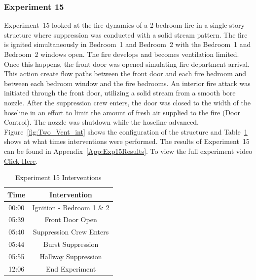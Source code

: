 \documentclass[12pt,oneside]{book}
\begin{document}
\subsubsection{Experiment 15}
Experiment~15 looked at the fire dynamics of a 2-bedroom fire in a single-story structure where suppression was conducted with a solid stream pattern. The fire is ignited simultaneously in Bedroom~1 and Bedroom~2 with the Bedroom~1 and Bedroom~2 windows open. The fire develops and becomes ventilation limited. Once this happens, the front door was opened simulating fire department arrival. This action create flow paths between the front door and each fire bedroom and between each bedroom window and the fire bedrooms. An interior fire attack was initiated through the front door, utilizing a solid stream from a smooth bore nozzle. After the suppression crew enters, the door was closed to the width of the hoseline in an effort to limit the amount of fresh air supplied to the fire (Door Control). The nozzle was shutdown while the hoseline advanced. Figure~\ref{fig:Two_Vent_int} shows the configuration of the structure and Table~\ref{Table:Exp15Interventions} shows at what times interventions were performed. The results of Experiment~15 can be found in Appendix~\ref{App:Exp15Results}. To view the full experiment video \href{https://player.vimeo.com/video/170499619?autoplay=1}{Click Here}.

\begin{table}[H]
	\centering
	\caption{Experiment 15 Interventions}
	\begin{tabular}{|c|c|} 
		\hline
		Time & Intervention \\ \hline \hline
		00:00 & Ignition - Bedroom 1 \& 2 \\ \hline
		05:39 & Front Door Open \\ \hline
		05:40 & Suppression Crew Enters\\ \hline
		05:44 & Burst Suppression \\ \hline 
		05:55 & Hallway Suppression \\ \hline
		12:06 & End Experiment\\ \hline
	\end{tabular}
	\label{Table:Exp15Interventions}
\end{table}

\FloatBarrier
\end{document}
